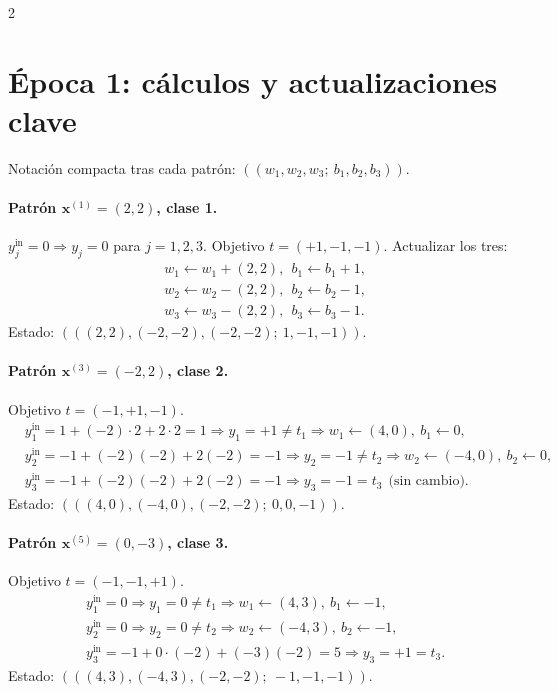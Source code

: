 \documentclass[11pt]{article}
\begin{document}
\begin{multicols}{2}
\section*{Época 1: cálculos y actualizaciones clave}

Notación compacta tras cada patrón: $((w_1,w_2,w_3;\ b_1,b_2,b_3))$.

\paragraph{Patrón $\bm{x}^{(1)}=(2,2)$, clase 1.}
$y^{\text{in}}_j=0\Rightarrow y_j=0$ para $j=1,2,3$. Objetivo $t=(+1,-1,-1)$. Actualizar los tres:
\[
\begin{aligned}
&w_1\leftarrow w_1+(2,2),\ \ b_1\leftarrow b_1+1,\\
&w_2\leftarrow w_2-(2,2),\ \ b_2\leftarrow b_2-1,\\
&w_3\leftarrow w_3-(2,2),\ \ b_3\leftarrow b_3-1.
\end{aligned}
\]
Estado: $(((2,2),(-2,-2),(-2,-2);\ 1,-1,-1))$.

\paragraph{Patrón $\bm{x}^{(3)}=(-2,2)$, clase 2.} Objetivo $t=(-1,+1,-1)$.
\[
\begin{aligned}
&y^{\text{in}}_1=1+(-2)\cdot 2+2\cdot 2=1\Rightarrow y_1=+1\neq t_1\Rightarrow w_1\leftarrow (4,0),\ b_1\leftarrow 0,\\
&y^{\text{in}}_2=-1+(-2)(-2)+2(-2)=-1\Rightarrow y_2=-1\neq t_2\Rightarrow w_2\leftarrow (-4,0),\ b_2\leftarrow 0,\\
&y^{\text{in}}_3=-1+(-2)(-2)+2(-2)=-1\Rightarrow y_3=-1=t_3\ \ \text{(sin cambio)}.
\end{aligned}
\]
Estado: $(((4,0),(-4,0),(-2,-2);\ 0,0,-1))$.

\paragraph{Patrón $\bm{x}^{(5)}=(0,-3)$, clase 3.} Objetivo $t=(-1,-1,+1)$.
\[
\begin{aligned}
&y^{\text{in}}_1=0\Rightarrow y_1=0\neq t_1\Rightarrow w_1\leftarrow (4,3),\ b_1\leftarrow -1,\\
&y^{\text{in}}_2=0\Rightarrow y_2=0\neq t_2\Rightarrow w_2\leftarrow (-4,3),\ b_2\leftarrow -1,\\
&y^{\text{in}}_3=-1+0\cdot(-2)+(-3)(-2)=5\Rightarrow y_3=+1=t_3.
\end{aligned}
\]
Estado: $(((4,3),(-4,3),(-2,-2);\ -1,-1,-1))$.


\end{multicols}
\end{document}
